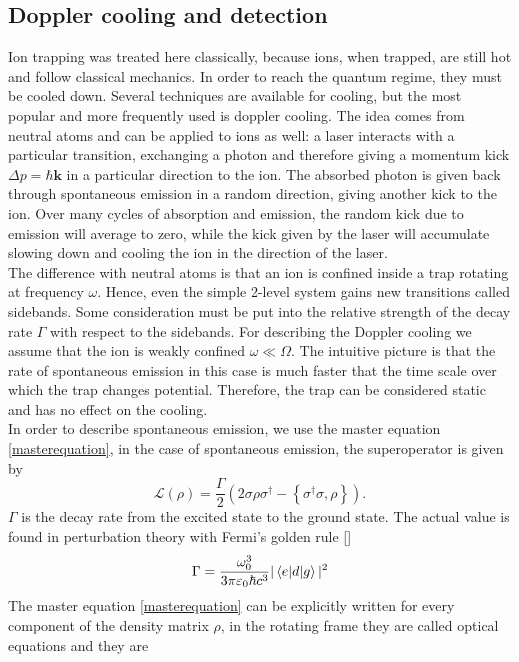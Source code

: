 \subsection{Doppler cooling and detection}
\label{sec:doppler_cooling}
Ion trapping was treated here classically, because ions, when trapped, are still hot and follow classical mechanics. In order to reach the quantum regime, they must be cooled down. Several techniques are available for cooling, but the most popular and more frequently used is doppler cooling. The idea comes from neutral atoms and can be applied to ions as well: a laser interacts with a particular transition, exchanging a photon and therefore giving a momentum kick $\Delta p = \hbar \mathbf{k}$ in a particular direction to the ion. The absorbed photon is given back through spontaneous emission in a random direction, giving another kick to the ion. Over many cycles of absorption and emission, the random kick due to emission will average to zero, while the kick given by the laser will accumulate slowing down and cooling the ion in the direction of the laser. \\
The difference with neutral atoms is that an ion is confined inside a trap rotating at frequency $\omega$. Hence, even the simple 2-level system gains new transitions called sidebands. Some consideration must be put into the relative strength of the decay rate $\Gamma$ with respect to the sidebands. For describing the Doppler cooling we assume that the ion is weakly confined $\omega \ll \Omega$. The intuitive picture is that the rate of spontaneous emission in this case is much faster that the time scale over which the trap changes potential. Therefore, the trap can be considered static  and has no effect on the cooling.\\
In order to describe spontaneous emission, we use the master equation \eqref{masterequation}, in the case of spontaneous emission, the superoperator is given by \cite{gabriel}
\begin{equation}
\mathcal{L}(\rho) = \frac{\Gamma}{2}\left(2\sigma \rho \sigma^\dagger - \left\{\sigma^\dagger \sigma, \rho\right\}\right).
\end{equation}
$\Gamma$ is the decay rate from the excited state to the ground state. The actual value is found in perturbation theory with Fermi's golden rule []
\begin{equation}
\Gamma = \frac{\omega_0^3}{3\pi \varepsilon_0 \hbar c^3} |\braket{e|d|g}|^2
\end{equation}
The master equation \eqref{masterequation} can be explicitly written for every component of the density matrix $\rho$, in the rotating frame they are called optical equations and they are
